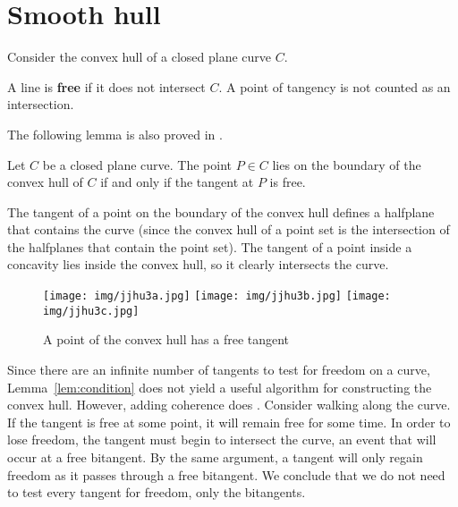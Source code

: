 \documentclass[11pt]{article}
\begin{document}

\section{Smooth hull}
\label{sec:hull}

Consider the convex hull of a closed plane curve $C$.

\begin{defn2}
A line is {\bf free} if it does not intersect $C$.
A point of tangency is not counted as an intersection.
\end{defn2}

The following lemma is also proved in \cite{elber01}. 

\begin{lemma}
\label{lem:condition}
Let $C$ be a closed plane curve.
The point $P \in C$ lies on the boundary of the convex hull of $C$ if and only if
the tangent at $P$ is free.
\end{lemma}
\prf
The tangent of a point on the boundary of the convex hull 
defines a halfplane that contains the curve 
(since the convex hull of a point set is the intersection of the halfplanes 
that contain the point set).
The tangent of a point inside a concavity lies inside the convex hull, so it
clearly intersects the curve.
\QED

\begin{figure}[h]
\begin{center}
\texttt{[image: img/jjhu3a.jpg]} 
\texttt{[image: img/jjhu3b.jpg]}
\texttt{[image: img/jjhu3c.jpg]}
\end{center}
\caption{A point of the convex hull has a free tangent}
\label{fig:tangent}
\end{figure}

Since there are an infinite number of tangents to test for freedom on a curve,
Lemma~\ref{lem:condition} does not yield a useful algorithm for constructing the convex hull.
However, adding coherence does \cite{foleyvandam}.
Consider walking along the curve.
If the tangent is free at some point, it will remain free for some time.
In order to lose freedom, the tangent must begin to intersect the curve,
an event that will occur at a free bitangent. %
By the same argument, a tangent will only regain freedom as it passes through a free bitangent.
We conclude that we do not need to test every tangent for freedom, only the bitangents.
\end{document}
